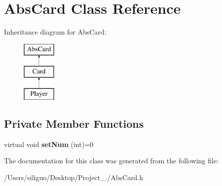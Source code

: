 \hypertarget{class_abs_card}{}\section{Abs\+Card Class Reference}
\label{class_abs_card}
Inheritance diagram for Abs\+Card\+:\begin{figure}[H]
\begin{center}
\leavevmode
\includegraphics[height=3.000000cm]{class_abs_card}
\end{center}
\end{figure}
\subsection*{Private Member Functions}
\begin{DoxyCompactItemize}
\item 
\hypertarget{class_abs_card_a6238689463855fa406fb6aedf1e0aed4}{}\label{class_abs_card_a6238689463855fa406fb6aedf1e0aed4} 
virtual void {\bfseries set\+Num} (int)=0
\end{DoxyCompactItemize}


The documentation for this class was generated from the following file\+:\begin{DoxyCompactItemize}
\item 
/\+Users/siliguo/\+Desktop/\+Project\+\_./Abs\+Card.\+h\end{DoxyCompactItemize}
